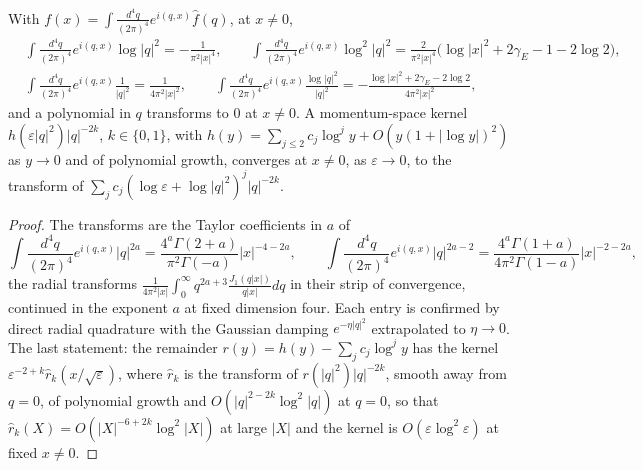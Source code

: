 \begin{lemma}
\label{lem:c20-fourier}
With $f(x)=\int\frac{d^4q}{(2\pi)^4}e^{i(q,x)}\hat f(q)$, at $x\ne0$,
\begin{equation}
\begin{aligned}
&\int\frac{d^4q}{(2\pi)^4}e^{i(q,x)}\log|q|^2=-\frac{1}{\pi^2|x|^4},\qquad \int\frac{d^4q}{(2\pi)^4}e^{i(q,x)}\log^2|q|^2=\frac{2}{\pi^2|x|^4}\big(\log|x|^2+2\gamma_E-1-2\log2\big),\\
&\int\frac{d^4q}{(2\pi)^4}e^{i(q,x)}\frac{1}{|q|^2}=\frac{1}{4\pi^2|x|^2},\qquad \int\frac{d^4q}{(2\pi)^4}e^{i(q,x)}\frac{\log|q|^2}{|q|^2}=-\frac{\log|x|^2+2\gamma_E-2\log2}{4\pi^2|x|^2},
\end{aligned}
\label{eq:c20-fourier}
\end{equation}
and a polynomial in $q$ transforms to $0$ at $x\ne0$. A momentum-space kernel $h(\varepsilon|q|^2)|q|^{-2k}$, $k\in\{0,1\}$, with $h(y)=\sum_{j\le2}c_j\log^jy+O(y(1+|\log y|)^2)$ as $y\to0$ and of polynomial growth, converges at $x\ne0$, as $\varepsilon\to0$, to the transform of $\sum_jc_j(\log\varepsilon+\log|q|^2)^j|q|^{-2k}$.
\end{lemma}

\begin{proof}
The transforms are the Taylor coefficients in $a$ of
\[
\int\frac{d^4q}{(2\pi)^4}e^{i(q,x)}|q|^{2a}=\frac{4^a\Gamma(2+a)}{\pi^2\Gamma(-a)}|x|^{-4-2a},\qquad \int\frac{d^4q}{(2\pi)^4}e^{i(q,x)}|q|^{2a-2}=\frac{4^a\Gamma(1+a)}{4\pi^2\Gamma(1-a)}|x|^{-2-2a},
\]
the radial transforms $\frac{1}{4\pi^2|x|}\int_0^\infty q^{2a+3}\frac{J_1(q|x|)}{q|x|}dq$ in their strip of convergence, continued in the exponent $a$ at fixed dimension four. Each entry is confirmed by direct radial quadrature with the Gaussian damping $e^{-\eta|q|^2}$ extrapolated to $\eta\to0$. The last statement: the remainder $r(y)=h(y)-\sum_jc_j\log^jy$ has the kernel $\varepsilon^{-2+k}\hat r_k(x/\sqrt\varepsilon)$, where $\hat r_k$ is the transform of $r(|q|^2)|q|^{-2k}$, smooth away from $q=0$, of polynomial growth and $O(|q|^{2-2k}\log^2|q|)$ at $q=0$, so that $\hat r_k(X)=O(|X|^{-6+2k}\log^2|X|)$ at large $|X|$ and the kernel is $O(\varepsilon\log^2\varepsilon)$ at fixed $x\ne0$.
\end{proof}

